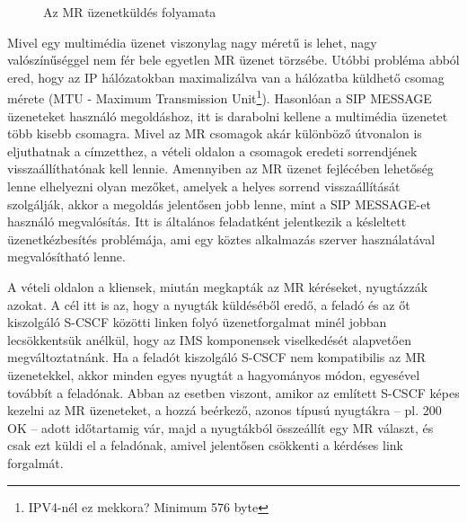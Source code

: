 \begin{figure}[htbp]
\center
{}
\caption{Az MR üzenetküldés folyamata}
\label{fig:mrflow}
\end{figure}

Mivel egy multimédia üzenet viszonylag nagy méretű is lehet, nagy valószínűséggel nem fér bele egyetlen MR üzenet törzsébe. Utóbbi probléma abból ered, hogy az IP hálózatokban maximalizálva van a hálózatba küldhető csomag mérete (MTU - Maximum Transmission Unit\footnote{IPV4-nél ez mekkora? Minimum 576 byte}). Hasonlóan a SIP MESSAGE üzeneteket használó megoldáshoz, itt is darabolni kellene a multimédia üzenetet több kisebb csomagra. Mivel az MR csomagok akár különböző útvonalon is eljuthatnak a címzetthez, a vételi oldalon a csomagok eredeti sorrendjének visszaállíthatónak kell lennie. Amennyiben az MR üzenet fejlécében lehetőség lenne elhelyezni olyan mezőket, amelyek a helyes sorrend visszaállítását szolgálják, akkor a megoldás jelentősen jobb lenne, mint a SIP MESSAGE-et használó megvalósítás. Itt is általános feladatként jelentkezik a késleltett üzenetkézbesítés problémája, ami egy köztes alkalmazás szerver használatával megvalósítható lenne.

A vételi oldalon a kliensek, miután megkapták az MR kéréseket, nyugtázzák azokat. A cél itt is az, hogy a nyugták küldéséből eredő, a feladó és az őt kiszolgáló S-CSCF közötti linken folyó üzenetforgalmat minél jobban lecsökkentsük anélkül, hogy az IMS komponensek viselkedését alapvetően megváltoztatnánk. Ha a feladót kiszolgáló S-CSCF nem kompatibilis az MR üzenetekkel, akkor minden egyes nyugtát a hagyományos módon, egyesével továbbít a feladónak. Abban az esetben viszont, amikor az említett S-CSCF képes kezelni az MR üzeneteket, a hozzá beérkező, azonos típusú nyugtákra -- pl. 200 OK -- adott időtartamig vár, majd a nyugtákból összeállít egy MR választ, és csak ezt küldi el a feladónak, amivel jelentősen csökkenti a kérdéses link forgalmát.


